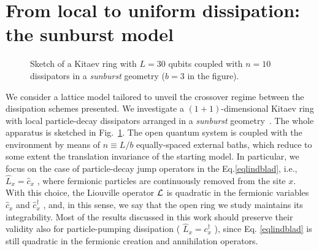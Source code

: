 \section{From local to uniform dissipation: the sunburst model}


\begin{figure}
    \centering
{}
    \caption{Sketch of a Kitaev ring with $L=30$ qubits coupled with $n=10$ dissipators in a \textit{sunburst} geometry ($b=3$ in the figure).}
    \label{fig_sketch_sunburst_dissipation}
\end{figure}

We consider a lattice model tailored to unveil the crossover regime between the  dissipation schemes presented. We investigate a $(1+1)$-dimensional Kitaev ring with local particle-decay dissipators arranged in a \textit{sunburst} geometry~\cite{FRV-staticsunburst, FRV-timesunburst, MS-2022-sunburstquench}. The whole apparatus is sketched in Fig.~\ref{fig_sketch_sunburst_dissipation}. The open quantum system is coupled with the environment by means of $n\equiv L/b$ equally-spaced external baths, which reduce to some extent the translation invariance of the starting model.
In particular, we focus on the case of particle-decay jump
operators in the Eq.\eqref{eqlindblad}, i.e., $\hat L_x = \hat c_x$ , where fermionic 
particles are continuously removed from the site $x$. With this choice,
the Liouville operator ${\cal L}$ is quadratic in the fermionic
variables $\hat c_x$ and $\hat c_x^\dagger$ , and, in this sense, we say that the
open ring we study maintains its integrability. Most of
the results discussed in this work should preserve their
validity also for particle-pumping dissipation ( $\hat L_x = c_x^\dagger$ ),
since Eq. \eqref{eqlindblad} is still quadratic in the fermionic creation
and annihilation operators.\\


